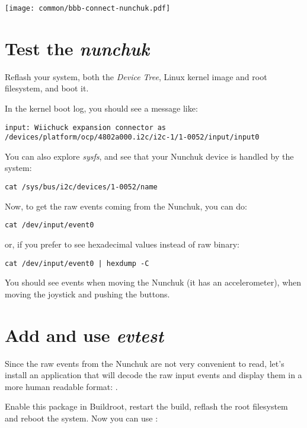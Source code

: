 \begin{center}
\texttt{[image: common/bbb-connect-nunchuk.pdf]}
\end{center}

\section{Test the {\em nunchuk}}

Reflash your system, both the {\em Device Tree}, Linux kernel image
and root filesystem, and boot it.

In the kernel boot log, you should see a message like:

\begin{verbatim}
input: Wiichuck expansion connector as /devices/platform/ocp/4802a000.i2c/i2c-1/1-0052/input/input0
\end{verbatim}

You can also explore {\em sysfs}, and see that your Nunchuk device is
handled by the system:

\begin{verbatim}
cat /sys/bus/i2c/devices/1-0052/name
\end{verbatim}

Now, to get the raw events coming from the Nunchuk, you can do:

\begin{verbatim}
cat /dev/input/event0
\end{verbatim}

or, if you prefer to see hexadecimal values instead of raw binary:

\begin{verbatim}
cat /dev/input/event0 | hexdump -C
\end{verbatim}

You should see events when moving the Nunchuk (it has an
accelerometer), when moving the joystick and pushing the buttons.

\section{Add and use {\em evtest}}

Since the raw events from the Nunchuk are not very convenient to read,
let's install an application that will decode the raw input events
and display them in a more human readable format: .

Enable this package in Buildroot, restart the build, reflash the root
filesystem and reboot the system. Now you can use :

